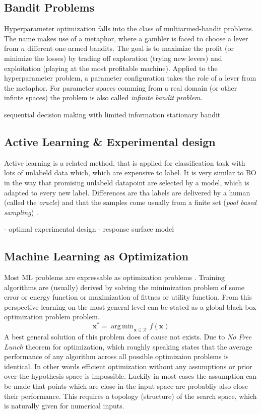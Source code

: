 \documentclass[english]{article}
\newcommand{\x}{\mathbf{x}}
\DeclareMathOperator*{\argmin}{arg\,min}
\begin{document}
\subsection{Bandit Problems}
Hyperparameter optimization falls into the class of multiarmed-bandit problems. The name makes use of a metaphor, where a gambler is faced to choose a lever from $n$ different one-armed bandits. The goal is to maximize the profit (or minimize the losses) by trading off exploration (trying new levers) and exploitation (playing at the most profitable machine). Applied to the hyperparameter problem, a parameter configuration takes the role of a lever from the metaphor. For parameter spaces comming from a real domain (or other infinte spaces) the problem is also called \textit{infinite bandit problem}.


sequential decision making
with limited information
stationary bandit


\subsection{Active Learning \& Experimental design}
Active learning is a related method, that is applied for classification task with lots of unlabeld data which, which are expensive to label. It is very similar to BO in the way that promising unlabeld datapoint are selected by a model, which is adapted to every new label. Differences are tha labels are delivered by a human (called the \textit{oracle}) and that the samples come usually from a finite set (\textit{pool based sampling}) \cite{settles_active_2010}.

 - optimal experimental design
 - response surface model

\subsection{Machine Learning as Optimization}
Most \acf{ML} problems are expressable as optimization problems \cite{bennett_interplay_2006}. Training algorithms are (usually) derived by solving the minimization problem of some error or energy function or maximization of fittnes or utility function. From this perspective learning on the most general level can be stated as a global black-box optimization problem problem.
$$\x^* = \argmin_{\x \in \mathcal{X}} f(\x)$$
A best general solution of this problem does of cause not exists. Due to \textit{No Free Lunch} theorem for optimization, which roughly speaking states that the average performance of any algorithm across all possible optimizaion problems is identical. In other words efficient optimization without any assumptions or prior over the hypothesis space is impossible. Luckily in most cases the assumption can be made that points which are close in the input space are probabliy also close their performance. This requires a topology (structure) of the search space, which is naturally given for numerical inputs.
\end{document}
